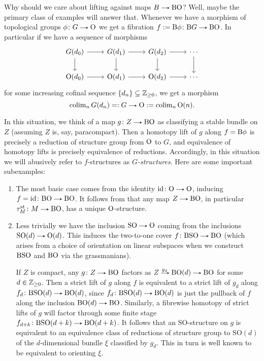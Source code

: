 \begin{examples}
  \label{f-examples}
  Why should we care about lifting against maps $B \to \B\O$? Well,
  maybe the primary class of examples will answer that. Whenever we
  have a morphism of topological groups $\phi \c G \to \O$ we get a
  fibration $f \ce \B\phi \c \B G \to \B\O$. In particular if we have
  a sequence of morphisms
  \[
  \begin{tikzcd}
    G(d_0) \ar[r] \ar[d] & G(d_1) \ar[r] \ar[d] & G(d_2) \ar[r] \ar[d]
    & \cdots \ar[d] \\ \O(d_0) \ar[r] & \O(d_1) \ar[r] & \O(d_2)
    \ar[r] & \cdots
  \end{tikzcd}
  \]
  for some increasing cofinal sequence $\{d_n\} \subseteq \mathbb{Z}_{\ge 0}$,
  we get a morphism
  \[
  \colim_n G(d_n) \ec G \to \O \ce \colim_n \O(n).
  \]
  
  In this situation, we think of a map $g \c Z \to \B\O$ as
  classifying a stable bundle on $Z$ (assuming $Z$ is, say,
  paracompact). Then a homotopy lift of $g$ along $f = \mathrm{B}\phi$ is
  precisely a reduction of structure group from $\mathrm{O}$ to $G$, and
  equivalence of homotopy lifts is precisely equivalence of
  reductions. Accordingly, in this situation we will abusively refer
  to $f$-structures as \emph{$G$-structures}. Here are some important
  subexamples:

  \newcommand{\SO}{\mathrm{SO}}
  \begin{enumerate}
  \item The most basic case comes from the identity $\id \c \O \to
    \O$, inducing $f = \id \c \B\O \to \B\O$. It follows from
     that any map $Z \to \B\O$, in particular
    $\tau^\st_M \c M \to \B\O$, has a unique $\mathrm{O}$-structure.
  \item Less trivially we have the inclusion $\SO \to \O$ coming from
    the inclusions $\SO(d) \to \O(d)$. This induces the two-to-one
    cover $f \c \B\SO \to \B\O$ (which arises from a choice of
    orientation on linear subspaces when we construct $\B\SO$ and
    $\mathrm{B}\mathrm{O}$ via the grassmanians).

    If $Z$ is compact, any $g \c Z \to \B\O$ factors as $Z \lblto{g_d}
    \B\O(d) \to \B\O$ for some $d \in \mathbb{Z}_{\ge 0}$. Then a strict lift
    of $g$ along $f$ is equivalent to a strict lift of $g_d$ along
    $f_d \c \B\SO(d) \to \B\O(d)$, since $f_d \c \B\SO(d) \to \B\O(d)$
    is just the pullback of $f$ along the inclusion $\B\O(d) \to
    \B\O$. Similarly, a fibrewise homotopy of strict lifts of $g$ will
    factor through some finite stage $f_{d+k} \c \B\SO(d+k) \to
    \B\O(d+k)$. It follows that an $\SO$-structure on $g$ is
    equivalent to an equivalence class of reductions of structure
    group to $\SO(d)$ of the $d$-dimensional bundle $\xi$ classified
    by $g_d$. This in turn is well known to be equivalent to orienting
    $\xi$.


\end{enumerate}
\end{examples}
